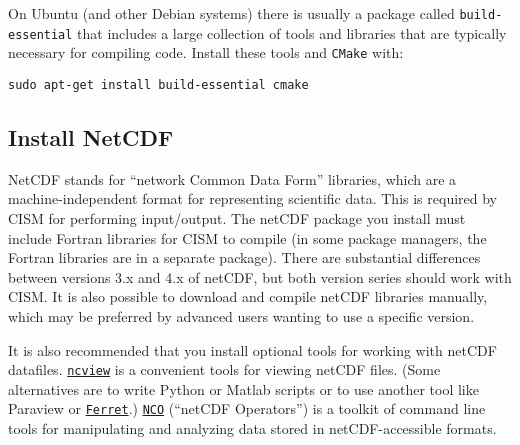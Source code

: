 \begin{mdframed}[style=ubuntu] %
On Ubuntu (and other Debian systems) there is usually a package called \texttt{build-essential} 
that includes a large collection of tools and libraries that are typically necessary
for compiling code. Install these tools and \texttt{CMake} with:

\texttt{sudo apt-get install build-essential cmake}
\end{mdframed}                 %


\subsection{Install NetCDF}
\label{sec:install-netcdf}
NetCDF stands for ``network Common Data Form'' libraries, which are a
 machine-independent format for representing scientific data.
This is required by CISM for performing input/output.  The netCDF package you 
install must include Fortran libraries for CISM to compile (in some package managers,
the Fortran libraries are in a separate package).  There are substantial differences 
between versions 3.x and 4.x of netCDF, but both version series should work with CISM. 
It is also possible to download and compile netCDF libraries manually, 
which may be preferred by advanced users wanting to use a specific version.

It is also recommended that you install optional tools for working with netCDF datafiles.
\href{http://meteora.ucsd.edu/~pierce/ncview_home_page.html}{\texttt{ncview}} is a
convenient tools for viewing netCDF files.  
(Some alternatives are to write Python or Matlab scripts or to use another tool like Paraview or
\href{http://ferret.pmel.noaa.gov/Ferret/home}{\texttt{Ferret}}.)  
\href{http://nco.sourceforge.net/}{\texttt{NCO}} (``netCDF Operators'') is a toolkit of command line tools
for manipulating and analyzing data stored in netCDF-accessible formats.

